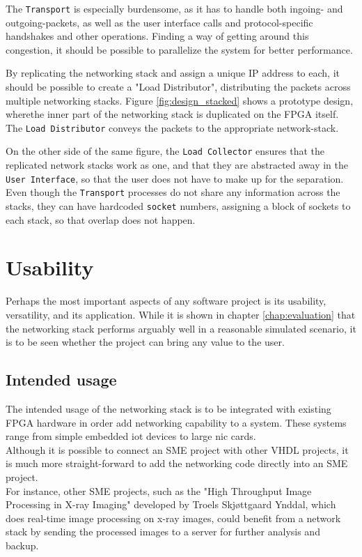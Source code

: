 The \texttt{Transport} is especially burdensome, as it has to handle both
ingoing- and outgoing-packets, as well as the user interface calls and
protocol-specific handshakes and other operations. Finding a way of getting
around this congestion, it should be possible to parallelize the system for
better performance.

By replicating the networking stack and assign a unique IP address to each, it
should be possible to create a "Load Distributor", distributing the packets
across multiple networking stacks. Figure \ref{fig:design_stacked} shows a
prototype design, wherethe inner part of the networking stack is duplicated on
the FPGA itself. The \texttt{Load Distributor} conveys the packets to the
appropriate network-stack.

On the other side of the same figure, the \texttt{Load Collector} ensures that
the replicated network stacks work as one, and that they are abstracted away
in the \texttt{User Interface}, so that the user does not have to make up for
the separation. Even though the \texttt{Transport} processes do not share any
information across the stacks, they can have hardcoded \texttt{socket} numbers,
assigning a block of sockets to each stack, so that overlap does not happen.



\section{Usability}
Perhaps the most important aspects of any software project is its usability,
versatility, and its application.
While it is shown in chapter \ref{chap:evaluation} that the networking stack
performs arguably well in a reasonable simulated scenario, it is to be seen
whether the project can bring any value to the user.

\subsection{Intended usage}
The intended usage of the networking stack is to be integrated with existing
FPGA hardware in order add networking capability to a system. These systems
range from simple embedded \gls{iot} devices to large \gls{nic} cards.\\
Although it is possible to connect an SME project with other VHDL projects, it
is much more straight-forward to add the networking code directly into an SME
project.\\
For instance, other SME projects, such as the "High Throughput Image Processing in X-ray
Imaging" developed by Troels Skjøttgaard Ynddal\cite{troels}, which does
real-time image processing on x-ray images, could benefit from a network stack
by sending the processed images to a server for further analysis and backup.

